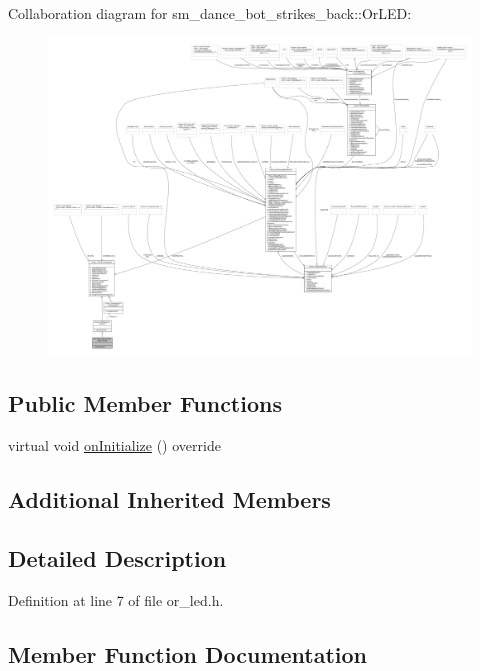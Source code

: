 Collaboration diagram for sm\+\_\+dance\+\_\+bot\+\_\+strikes\+\_\+back\+:\+:Or\+L\+ED\+:
\nopagebreak
\begin{figure}[H]
\begin{center}
\leavevmode
\includegraphics[width=350pt]{classsm__dance__bot__strikes__back_1_1OrLED__coll__graph}
\end{center}
\end{figure}
\subsection*{Public Member Functions}
\begin{DoxyCompactItemize}
\item 
virtual void \hyperlink{classsm__dance__bot__strikes__back_1_1OrLED_add5765c98e0ecf7bfe579d96095db652}{on\+Initialize} () override
\end{DoxyCompactItemize}
\subsection*{Additional Inherited Members}


\subsection{Detailed Description}


Definition at line 7 of file or\+\_\+led.\+h.



\subsection{Member Function Documentation}
\mbox{\label{classsm__dance__bot__strikes__back_1_1OrLED_add5765c98e0ecf7bfe579d96095db652}} 
